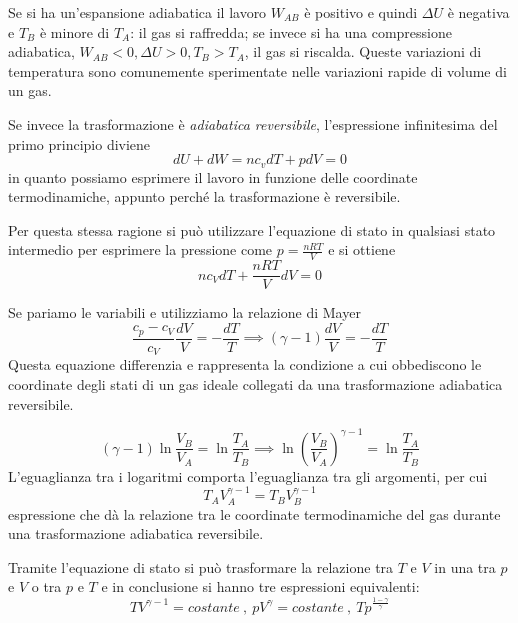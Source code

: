 \documentclass[class=book, crop=false, oneside, 12pt]{standalone}
\begin{document}
Se si ha un'espansione adiabatica il lavoro \(W_{AB}\) è positivo e quindi \(\Delta U\) è negativa e \(T_B\) è minore di \(T_A\): il gas si raffredda; se invece si ha una compressione adiabatica, \(W_{AB}<0, \Delta U > 0 , T_B > T_A\), il gas si riscalda. 
Queste variazioni di temperatura sono comunemente sperimentate nelle variazioni rapide di volume di un gas.

Se invece la trasformazione è \emph{adiabatica reversibile}, l'espressione infinitesima del primo principio diviene
\begin{equation*}
    d U + d W = n c_v d T + p d V = 0
\end{equation*}
in quanto possiamo esprimere il lavoro in funzione delle coordinate termodinamiche, appunto perché la trasformazione è reversibile.

Per questa stessa ragione si può utilizzare l'equazione di stato in qualsiasi stato intermedio per esprimere la pressione come \(p = \frac{n R T}{V}\) e si ottiene
\begin{equation*}
    n c_V d T + \frac{n R T}{V} d V = 0
\end{equation*}

Se pariamo le variabili e utilizziamo la relazione di Mayer
\begin{equation*}
    \frac{c_p -c_V}{c_V} \frac{d V}{V} = - \frac{d T}{T} \implies (\gamma - 1) \frac{d V}{V} = - \frac{d T}{T}
\end{equation*}
Questa equazione differenzia e rappresenta la condizione a cui obbediscono le coordinate degli stati di un gas ideale collegati da una trasformazione adiabatica reversibile.

\begin{equation*}
    (\gamma - 1) \ln \frac{V_{B}}{V_A} = \ln \frac{T_A}{T_B} \implies \ln \left(\frac{V_B}{V_A}\right)^{\gamma - 1 } = \ln \frac{T_A}{T_B}
\end{equation*}
L'eguaglianza tra i logaritmi comporta l'eguaglianza tra gli argomenti, per cui
\begin{equation*}
    T_A V_A^{\gamma - 1} = T_B V_B^{\gamma - 1}
\end{equation*}
espressione che dà la relazione tra le coordinate termodinamiche del gas durante una trasformazione adiabatica reversibile. 

Tramite l'equazione di stato si può trasformare la relazione tra \(T\) e \(V\) in una tra \(p\) e \(V\) o tra \(p\) e \(T\) e in conclusione si hanno tre espressioni equivalenti:
\begin{equation}
    T V^{\gamma - 1 } = costante \ , \ pV^{\gamma} = costante \ , \ T p^{\frac{1 - \gamma}{\gamma}}
\end{equation}
\end{document}
